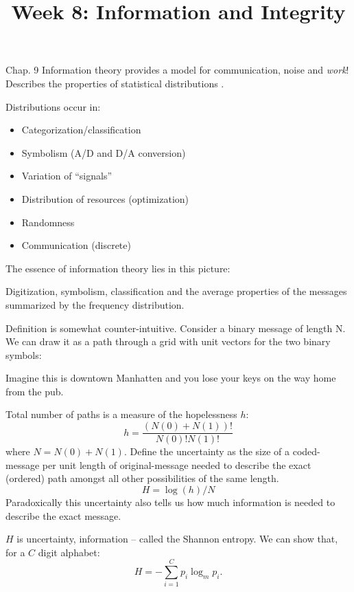 \documentclass{slides}
\title{Week 8: Information and Integrity}
\begin{document}
\maketitle



Chap. 9
Information theory provides a model for communication, noise and {\em work}!
Describes the properties of statistical distributions .

Distributions occur in:
\begin{itemize}
\item Categorization/classification
\item Symbolism (A/D and D/A conversion)
\item Variation of ``signals''
\item Distribution of resources (optimization)
\item Randomness
\item Communication (discrete)
\end{itemize}


The essence of information theory lies in this picture:


Digitization, symbolism, classification and the average properties
of the messages summarized by the frequency distribution.


Definition is somewhat counter-intuitive. Consider a binary
message of length N. We can draw it as a path through a grid
with unit vectors for the two binary symbols:


Imagine this is downtown Manhatten and you lose your keys
on the way home from the pub.


Total number of paths is a measure of the hopelessness $h$:
$$
h = \frac{(N(0)+N(1))!}{N(0)!N(1)!}
$$
where $N=N(0)+N(1)$.
Define the uncertainty as the size of a coded-message per unit length of
original-message needed to describe the exact (ordered) path amongst all
other possibilities of the same length.
$$
H = \log(h)/N
$$
Paradoxically this uncertainty also tells us how much information is needed
to describe the exact message.

$H$ is uncertainty, information -- called the Shannon entropy.
We can show that, for a $C$ digit alphabet:
$$
H = -\sum_{i=1}^C p_i \log_m p_i.
$$
\end{document}
